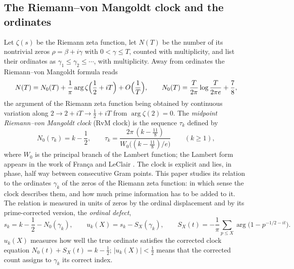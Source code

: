 \documentclass[preprint,12pt]{elsarticle}
\numberwithin{equation}{section}
\theoremstyle{plain}
\theoremstyle{definition}
\theoremstyle{remark}
\newcommand{\NO}{N_0}
\begin{document}
\subsection{The Riemann--von Mangoldt clock and the ordinates}
\label{subsec:clock_intro}
Let $\zeta(s)$ be the Riemann zeta function, let $N(T)$ be the number of its nontrivial zeros $\rho=\beta+i\gamma$ with $0<\gamma\le T$, counted with multiplicity, and list their ordinates as $\gamma_1\le\gamma_2\le\cdots$, with multiplicity. Away from ordinates the Riemann--von Mangoldt formula reads \cite[\S\S9.3--9.4]{Titchmarsh1986}
\begin{equation}
 N(T)=\NO(T)+\frac1\pi\arg\zeta\Bigl(\frac12+iT\Bigr)+O\Bigl(\frac1T\Bigr),\qquad \NO(T)=\frac{T}{2\pi}\log\frac{T}{2\pi e}+\frac78,
 \label{eq:intro_rvm}
\end{equation}
the argument of the Riemann zeta function being obtained by continuous variation along $2\to2+iT\to\frac12+iT$ from $\arg\zeta(2)=0$. The \emph{midpoint Riemann--von Mangoldt clock} (RvM clock) is the sequence $\tau_k$ defined by
\begin{equation}
 \NO(\tau_k)=k-\frac12,\qquad \tau_k=\frac{2\pi\,(k-\frac{11}8)}{W_0\bigl((k-\frac{11}8)/e\bigr)}\qquad(k\ge1),
 \label{eq:intro_clock}
\end{equation}
where $W_0$ is the principal branch of the Lambert function; the Lambert form appears in the work of Fran\c{c}a and LeClair \cite{FrancaLeClair2014,FrancaLeClair2015}. The clock is explicit and lies, in phase, half way between consecutive Gram points. This paper studies its relation to the ordinates $\gamma_k$ of the zeros of the Riemann zeta function: in which sense the clock describes them, and how much prime information has to be added to it. The relation is measured in units of zeros by the ordinal displacement and by its prime-corrected version, the \emph{ordinal defect},
\begin{equation}
 s_k=k-\frac12-\NO(\gamma_k),\qquad u_k(X)=s_k-S_X(\gamma_k),\qquad S_X(t)=-\frac1\pi\sum_{p\le X}\arg\bigl(1-p^{-1/2-it}\bigr).
 \label{eq:intro_defect}
\end{equation}
$u_k(X)$ measures how well the true ordinate satisfies the corrected clock equation $\NO(t)+S_X(t)=k-\frac12$; $|u_k(X)|<\frac12$ means that the corrected count assigns to $\gamma_k$ its correct index.
\end{document}
